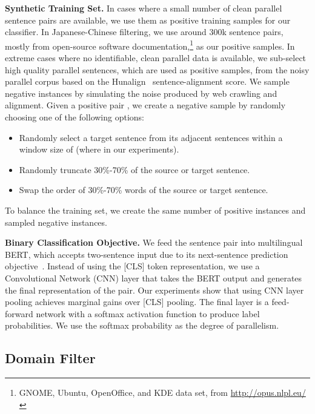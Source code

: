 \documentclass[11pt,a4paper]{article}
\begin{document}
\textbf{Synthetic Training Set.} In cases where a small number of clean parallel sentence pairs are available, we use them as positive training samples for our classifier. In Japanese-Chinese filtering, we use around 300k sentence pairs, mostly from open-source software documentation,\footnote{GNOME, Ubuntu, OpenOffice, and KDE data set, from \url{http://opus.nlpl.eu/}} as our positive samples.  In extreme cases where no identifiable, clean parallel data is available, we sub-select high quality parallel sentences, which are used as positive samples, from the noisy parallel corpus based on the Hunalign~\cite{varga2007parallel} sentence-alignment score.
We sample negative instances by simulating the noise produced by web crawling and alignment.
Given a positive pair , we create a negative sample by randomly choosing one of the following options:
\begin{itemize}
	\item Randomly select a target sentence from its adjacent sentences within a window size of  (where  in our experiments).
	\item Randomly truncate 30\%-70\% of the source or target sentence.
	\item Swap the order of 30\%-70\% words of the source or target sentence.
\end{itemize}
To balance the training set, we create the same number of positive instances and sampled negative instances.

\textbf{Binary Classification Objective.} 
We feed the sentence pair  into multilingual BERT, which accepts two-sentence input due to its next-sentence prediction objective~\cite{devlin2018bert}.  Instead of using the [CLS] token representation, we use a Convolutional Network (CNN) layer that takes the BERT output and generates the final representation of the pair. Our experiments show that using CNN layer pooling achieves marginal gains over [CLS] pooling. The final layer is a feed-forward network with a softmax activation function to produce label probabilities.  We use the softmax probability as the degree of parallelism.











\subsection{Domain Filter}
\end{document}
